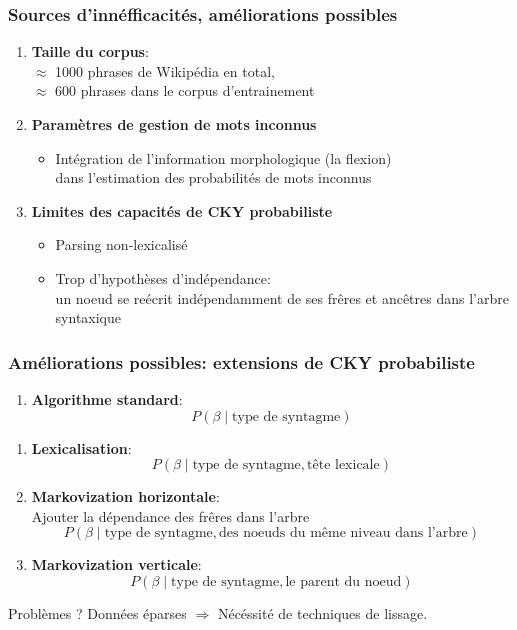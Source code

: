 \documentclass{beamer}
\begin{document}
\begin{frame}
\frametitle{Sources d'inn\'efficacit\'es, am\'eliorations possibles}
\pause
\begin{enumerate}
\item \textbf{Taille du corpus}:
\\ $\approx$ 1000 phrases de Wikip\'edia en total,
\\ $\approx$ 600 phrases dans le corpus d'entrainement
\pause
\item \textbf{Param\`etres de gestion de mots inconnus}
\pause
\begin{itemize}
\item Int\'egration de l'information morphologique (la flexion)
\\ dans l'estimation des probabilit\'es de mots inconnus
\end{itemize}
\pause
\item \textbf{Limites des capacit\'es de CKY probabiliste}
\pause
\begin{itemize}
\item Parsing non-lexicalis\'e
\pause
\item Trop d'hypoth\`eses d'ind\'ependance:
\\ un noeud se re\'ecrit ind\'ependamment de ses fr\^eres et anc\^etres dans l'arbre
syntaxique
\end{itemize}
\end{enumerate}

\end{frame}

\begin{frame}
\frametitle{Am\'eliorations possibles: extensions de CKY probabiliste}
\begin{enumerate}
\setcounter{enumi}{0}
\item \textbf{Algorithme standard}:
$$P(\beta \mid \text{type de syntagme})$$
\end{enumerate}

\pause
\begin{enumerate}
\item \textbf{Lexicalisation}:
$$P(\beta \mid \text{type de syntagme}, \text{t\^ete lexicale})$$
\pause
\item \textbf{Markovization horizontale}:
\pause
\\ Ajouter la d\'ependance des fr\^eres dans l'arbre
$$P(\beta \mid \text{type de syntagme}, \text{des noeuds du m\^eme niveau dans l'arbre})$$
\pause
\item \textbf{Markovization verticale}:
$$P(\beta \mid \text{type de syntagme}, \text{le parent du noeud})$$
\end{enumerate}

\pause
Probl\`emes ?
\pause
Donn\'ees \'eparses $\Rightarrow$ N\'ec\'essit\'e de techniques de lissage.

\end{frame}
\end{document}
